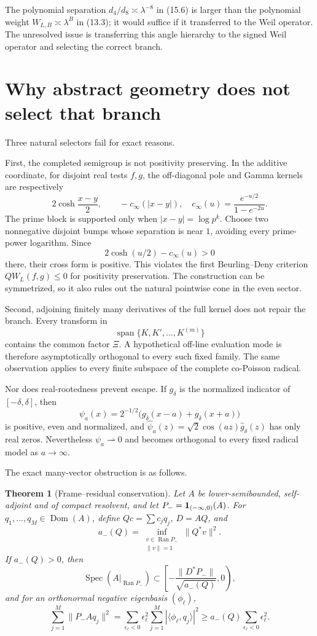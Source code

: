 \documentclass[11pt]{amsart}
\newtheorem{theorem}{Theorem}[section]
\theoremstyle{definition}
\theoremstyle{remark}
\newcommand{\Ran}{\operatorname{Ran}}
\newcommand{\Spec}{\operatorname{Spec}}
\newcommand{\XiR}{\Xi}
\begin{document}
The polynomial separation \(d_4/d_8\asymp\lambda^{-8}\) in (15.6) is
larger than the polynomial weight \(W_{L,B}\asymp\lambda^B\) in (13.3); it
would suffice if it transferred to the Weil operator.  The unresolved issue is transferring this
angle hierarchy to the signed Weil operator and selecting the correct
branch.

\section{Why abstract geometry does not select that branch}
\label{sec:nogos}

Three natural selectors fail for exact reasons.

First, the completed semigroup is not positivity preserving.  In the
additive coordinate, for disjoint real tests \(f,g\), the off-diagonal pole
and Gamma kernels are respectively
\[
 2\cosh\frac{x-y}{2},
 \qquad
 -c_\infty(|x-y|),
 \quad
 c_\infty(u)=\frac{e^{-u/2}}{1-e^{-2u}}.
\]
The prime block is supported only when \(|x-y|=\log p^k\).  Choose two
nonnegative disjoint bumps whose separation is near \(1\), avoiding every
prime-power logarithm.  Since
\[
 2\cosh(u/2)-c_\infty(u)>0
\]
there, their cross form is positive.  This violates the first
Beurling--Deny criterion \(QW_L(f,g)\le0\) for positivity preservation.
The construction can be symmetrized, so it also rules out the natural
pointwise cone in the even sector.

Second, adjoining finitely many derivatives of the full kernel does not
repair the branch.  Every transform in
\[
 \operatorname{span}\{K,K',\ldots,K^{(m)}\}
\]
contains the common factor \(\XiR\).  A hypothetical off-line evaluation
mode is therefore asymptotically orthogonal to every such fixed family.
The same observation applies to every finite subspace of the complete
co-Poisson radical.

Nor does real-rootedness prevent escape.  If \(g_\delta\) is the normalized
indicator of \([-\delta,\delta]\), then
\[
 \psi_a(x)=2^{-1/2}\bigl(g_\delta(x-a)+g_\delta(x+a)\bigr)
\]
is positive, even and normalized, and
\(\widehat\psi_a(z)=\sqrt2\cos(az)\widehat g_\delta(z)\) has only real
zeros.  Nevertheless \(\psi_a\rightharpoonup0\) and becomes orthogonal to
every fixed radical model as \(a\to\infty\).

The exact many-vector obstruction is as follows.

\begin{theorem}[Frame--residual conservation]
\label{thm:frame-residual}
Let \(A\) be lower-semibounded, self-adjoint and of compact resolvent, and
let \(P_-={\bf1}_{(-\infty,0)}(A)\).  For
\(q_1,\ldots,q_M\in\operatorname{Dom}(A)\), define
\(Qc=\sum c_jq_j\), \(D=AQ\), and
\[
 a_-(Q)=\inf_{\substack{v\in\Ran P_-\\\|v\|=1}}\|Q^*v\|^2.
\]
If \(a_-(Q)>0\), then
\[
 \Spec(A|_{\Ran P_-})
 \subset\left[-\frac{\|D^*P_-\|}{\sqrt{a_-(Q)}},0\right),
 \tag{16.1}
\]
and for an orthonormal negative eigenbasis \((\phi_\ell)\),
\[
 \boxed{
 \sum_{j=1}^M\|P_-Aq_j\|^2
 =\sum_{\epsilon_\ell<0}\epsilon_\ell^2
   \sum_{j=1}^M|\langle\phi_\ell,q_j\rangle|^2
 \ge a_-(Q)\sum_{\epsilon_\ell<0}\epsilon_\ell^2.}
 \tag{16.2}
\]
\end{theorem}
\end{document}
